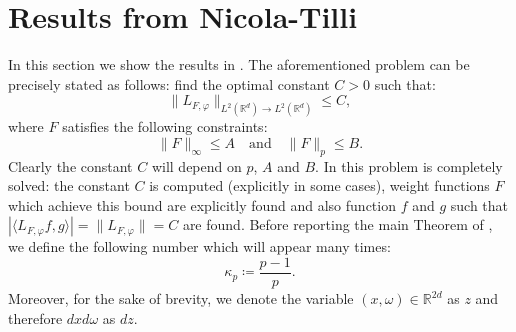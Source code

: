 \documentclass[corpo=11pt, stile=classica, tipotesi=custom,
greek, evenboxes, english]{toptesi}
\numberwithin{equation}{chapter}
\theoremstyle{definition}
\theoremstyle{remark}
\newcommand{\R}{\mathbb{R}} %
\begin{document}
\section{Results from Nicola-Tilli}\label{section norm of localization operators}
In this section we show the results in \cite{nicolatilli_norm}. The aforementioned problem can be precisely stated as follows: find the optimal constant $C > 0$ such that:
\begin{equation}\label{sharp estimate Nicola-Tilli}
	\|L_{F, \varphi}\|_{L^2(\R^d) \rightarrow L^2(\R^d)} \leq C,
\end{equation}
where $F$ satisfies the following constraints:
\begin{equation}\label{constraints Nicola-Tilli}
	\|F\|_{\infty} \leq A \quad \text{and} \quad \|F\|_p \leq B.
\end{equation}
Clearly the constant $C$ will depend on $p$, $A$ and $B$. In \cite{nicolatilli_norm} this problem is completely solved: the constant $C$ is computed (explicitly in some cases), weight functions $F$ which achieve this bound are explicitly found and also function $f$ and $g$ such that $|\langle L_{F, \varphi} f, g \rangle| = \|L_{F, \varphi}\| = C$ are found. Before reporting the main Theorem of \cite{nicolatilli_norm}, we define the following number which will appear many times:
\begin{equation}\label{kappa_p}
	\kappa_p \coloneqq \dfrac{p-1}{p}.
\end{equation}
Moreover, for the sake of brevity, we denote the variable $(x,\omega) \in \R^{2d}$ as $z$ and therefore $dxd\omega$ as $dz$.
\end{document}
